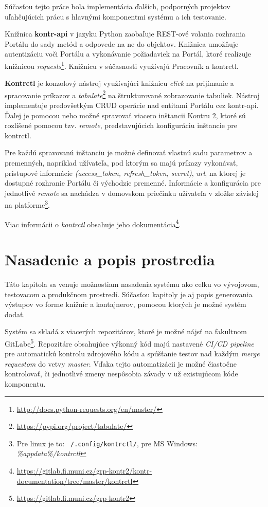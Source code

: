 \documentclass[
  digital, %
  oneside, %
  table,   %
  lof,     %
  lot,   %
]{fithesis3}
\newcommand*{\footurl}[1]{\footnote{\url{#1}}}
\begin{document}
\label{impl-other-parts}
Súčasťou tejto práce bola implementácia ďalších, podporných projektov uľahčujúcich prácu s hlavnými komponentmi systému a ich testovanie.

Knižnica \textbf{kontr-api} v jazyku Python zaobaľuje REST-ové volania rozhrania Portálu do sady metód a odpovede na ne do objektov. Knižnica umožňuje autentizáciu voči Portálu a vykonávanie požiadaviek na Portál, ktoré realizuje knižnicou \emph{requests}\footurl{http://docs.python-requests.org/en/master/}. Knižnicu v súčasnosti využívajú Pracovník a kontrctl. 

\textbf{Kontrctl} je konzolový nástroj využívajúci knižnicu \emph{click} na prijímanie a spracovanie príkazov a \emph{tabulate}\footurl{https://pypi.org/project/tabulate/} na štrukturované zobrazovanie tabuliek. Nástroj implementuje predovšetkým CRUD operácie nad entitami Portálu cez kontr-api. Ďalej je pomocou neho možné spravovať viacero inštancii Kontru 2, ktoré sú rozlíšené pomocou tzv. \emph{remote}, predstavujúcich konfiguráciu inštancie pre kontrctl.

Pre každú spravovanú inštanciu je možné definovať vlastnú sadu parametrov a premenných, napríklad užívateľa, pod ktorým sa majú príkazy vykonávať, prístupové informácie \emph{(access\_token, refresh\_token, secret)}, \emph{url}, na ktorej je dostupné rozhranie Portálu či východzie premenné. Informácie a konfigurácia pre jednotlivé \emph{remote} sa nachádza v domovskom priečinku užívateľa v zložke závislej na platforme\footnote{Pre linux je to: \texttt{~/.config/kontrctl/}, pre MS Windows: \emph{\%appdata\%/kontrctl}}.

Viac informácii o \emph{kontrctl} obsahuje jeho dokumentácia\footnote{\url{https://gitlab.fi.muni.cz/grp-kontr2/kontr-documentation/tree/master/kontrctl}}.

\chapter{Nasadenie a popis prostredia}

Táto kapitola sa venuje možnostiam nasadenia systému ako celku vo vývojovom, testovacom a produkčnom prostredí. Súčasťou kapitoly je aj popis generovania výstupov vo forme knižníc a kontajnerov, pomocou ktorých je možné systém dodať.

Systém sa skladá z viacerých repozitárov, ktoré je možné nájsť na fakultnom GitLabe\footnote{\url{https://gitlab.fi.muni.cz/grp-kontr2}}. Repozitáre obsahujúce výkonný kód majú nastavené \emph{CI/CD pipeline} pre automatickú kontrolu zdrojového kódu a spúšťanie testov nad každým \emph{merge requestom} do vetvy \emph{master}. Vďaka tejto automatizácii je možné čiastočne kontrolovať, či jednotlivé zmeny nespôsobia závady v už existujúcom kóde komponentu.
\end{document}
